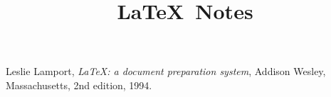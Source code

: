 \documentclass{article}
\title{\LaTeX~Notes}
\author{}
\date{}
\begin{document}
\maketitle

\begin{thebibliography}{9}

    Leslie Lamport,
    \emph{\LaTeX\@: a document preparation system},
    Addison Wesley, Massachusetts,
    2nd edition,
    1994.

\end{thebibliography}
\end{document}
